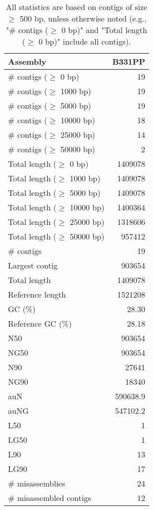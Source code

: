 \documentclass[12pt,a4paper]{article}
\begin{document}
\begin{table}[ht]
\begin{center}
\caption{All statistics are based on contigs of size $\geq$ 500 bp, unless otherwise noted (e.g., "\# contigs ($\geq$ 0 bp)" and "Total length ($\geq$ 0 bp)" include all contigs).}
\begin{tabular}{|l*{1}{|r}|}
\hline
Assembly & B331PP \\ \hline
\# contigs ($\geq$ 0 bp) & 19 \\ \hline
\# contigs ($\geq$ 1000 bp) & 19 \\ \hline
\# contigs ($\geq$ 5000 bp) & 19 \\ \hline
\# contigs ($\geq$ 10000 bp) & 18 \\ \hline
\# contigs ($\geq$ 25000 bp) & 14 \\ \hline
\# contigs ($\geq$ 50000 bp) & 2 \\ \hline
Total length ($\geq$ 0 bp) & 1409078 \\ \hline
Total length ($\geq$ 1000 bp) & 1409078 \\ \hline
Total length ($\geq$ 5000 bp) & 1409078 \\ \hline
Total length ($\geq$ 10000 bp) & 1400364 \\ \hline
Total length ($\geq$ 25000 bp) & 1318606 \\ \hline
Total length ($\geq$ 50000 bp) & 957412 \\ \hline
\# contigs & 19 \\ \hline
Largest contig & 903654 \\ \hline
Total length & 1409078 \\ \hline
Reference length & 1521208 \\ \hline
GC (\%) & 28.30 \\ \hline
Reference GC (\%) & 28.18 \\ \hline
N50 & 903654 \\ \hline
NG50 & 903654 \\ \hline
N90 & 27641 \\ \hline
NG90 & 18340 \\ \hline
auN & 590638.9 \\ \hline
auNG & 547102.2 \\ \hline
L50 & 1 \\ \hline
LG50 & 1 \\ \hline
L90 & 13 \\ \hline
LG90 & 17 \\ \hline
\# misassemblies & 24 \\ \hline
\# misassembled contigs & 12 \\ \hline

\end{tabular}
\end{center}
\end{table}
\end{document}
